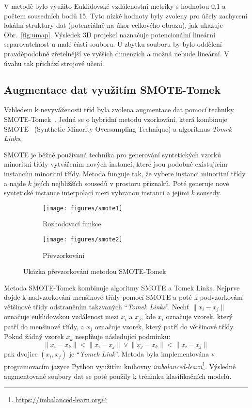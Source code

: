 V metodě bylo využito Euklidovské vzdálenostní metriky s hodnotou 0,1 a počtem
sousedních bodů 15. Tyto nízké hodnoty byly zvoleny pro účely zachycení lokální
struktury dat (potenciálně na úkor celkového obrazu), jak ukazuje
Obr.~\ref{fig:umap}. Výsledek 3D projekcí naznačuje potencionální lineární
separovatelnost u malé části souboru. U zbytku souboru by bylo oddělení
pravděpodobně zřetelnější ve vyšších dimenzích a možná nebude lineární. V úvahu
tak přichází strojové učení.

\subsection{Augmentace dat využitím SMOTE-Tomek}
\label{subsec:augmentace_dat}
Vzhledem k nevyváženosti tříd byla zvolena augmentace dat pomocí techniky
SMOTE-Tomek~\cite{tomek}. Jedná se o hybridní metodu vzorkování, která kombinuje
\gls{SMOTE}~\cite{smote} (Synthetic Minority Oversampling Technique) a
algoritmus \textit{Tomek Links}. 

\gls{SMOTE} je běžně používaná technika pro generování syntetických vzorků
minoritní třídy vytvářením nových instancí, které jsou podobné existujícím
instancím minoritní třídy. Metoda funguje tak, že vybere instanci minoritní
třídy a najde $k$ jejích nejbližších sousedů v prostoru příznaků. Poté generuje
nové syntetické instance interpolací mezi vybranou instancí a jejími $k$
sousedy.

\begin{figure}[h]
    \centering
    \begin{subfigure}[h]{0.4\linewidth}
        \texttt{[image: figures/smote1]}
        \caption{Rozhodovací funkce}
    \end{subfigure}
    \hspace{0.7cm}
    \begin{subfigure}[h]{0.4\linewidth}
        \texttt{[image: figures/smote2]}
        \caption{Převzorkování}
    \end{subfigure}
    \caption{Ukázka převzorkování metodou SMOTE-Tomek}
    \label{fig:smote}
\end{figure}

Metoda SMOTE-Tomek kombinuje algoritmy SMOTE a Tomek Links. Nejprve dojde k
nadvzorkování menšinové třídy pomocí SMOTE a poté k podvzorkování většinové
třídy odstraněním takzvaných \enquote{\textit{Tomek Links}}. Nechť $\lVert x_i -
x_j \rVert$ označuje euklidovskou vzdálenost mezi $x_i$ a $x_j$, kde $x_i$
označuje vzorek, který patří do menšinové třídy, a $x_j$ označuje vzorek, který
patří do většinové třídy. Pokud žádný vzorek $x_k$ nesplňuje následující
podmínku:
\begin{equation}
    \lVert x_i - x_k \rVert < \lVert x_i - x_j \rVert \lor \lVert x_j - x_k \rVert < \lVert x_i - x_j \rVert
\end{equation}
pak dvojice $(x_i, x_j)$ je \enquote{\textit{Tomek Link}}. Metoda byla
implementována v programovacím jazyce Python využitím knihovny
\textit{imbalanced-learn}\footnote{\url{https://imbalanced-learn.org}}. Výsledné
augmentované soubory dat se poté použily k tréninku klasifikačních modelů.